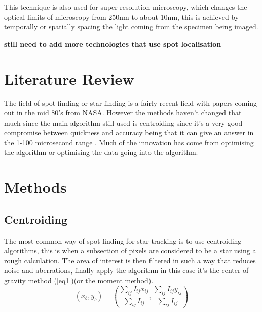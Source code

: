 \documentclass[aps,pra,a4paper,nofootinbib,onecolumn,tightenlines,longbibliography,12pt,amsfonts,amssymb,amsmath,floatfix]{revtex4-2} %
\begin{document}
  This technique is also used for super-resolution microscopy, which changes the
  optical limits of microscopy from 250nm to about 10nm, this is achieved by
  temporally or spatially spacing the light coming from the specimen being
  imaged. 

  \textbf{still need to add more technologies that use spot localisation}
  
  



\section{Literature Review} %
\label{sec:lit review}


The field of spot finding or star finding is a fairly recent field with papers
coming out in the mid 80's from NASA. However the methods haven't changed that
much since the main algorithm still used is centroiding since it's a very good
compromise between quickness and accuracy being that it can give an answer in
the 1-100 microsecond range \cite{delabie2014accurate}. Much of the innovation
has come from optimising the algorithm or optimising the data going into the
algorithm. 


\section{Methods} %
\label{sec:Background}

  \subsection{Centroiding} %
  \label{sub:Centroiding_meth}
  
  
  
  The most common way of spot finding for star tracking is to use centroiding
  algorithms, this is when a subsection of pixels are considered to be a star
  using a rough calculation. The area of interest is then filtered in such a way
  that reduces noise and aberrations, finally apply the algorithm in this case
  it's the center of gravity method (\ref{eq1})(or the moment
  method)\cite{delabie2014accurate}\cite{stone1989comparison}.
  \begin{equation}\label{eq1}
      (x_b,y_b) = \left( {\frac{\sum_{ij} I_{ij}x_{ij}}{\sum_{ij} I_{ij}},\frac{\sum_{ij} I_{ij}y_{ij}}{\sum_{ij} I_{ij}}}\right)
  \end{equation}
  
\end{document}
